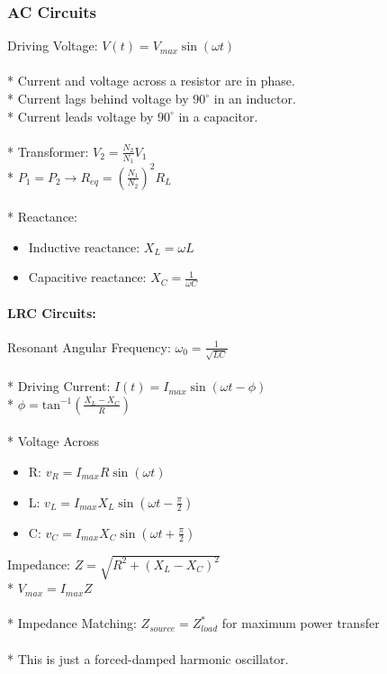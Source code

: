 \subsubsection{AC Circuits}
Driving Voltage: \(V(t)=V_{max}\sin(\omega t)\)\\\\*
Current and voltage across a resistor are in phase.\\*
Current lags behind voltage by \(90^{\circ}\) in an inductor.\\*
Current leads voltage by \(90^{\circ}\) in a capacitor.\\\\*
Transformer: \(\displaystyle V_2=\frac{N_2}{N_1}V_1\)\\*
\(\displaystyle P_1=P_2\to R_{eq}=\left(\frac{N_1}{N_2}\right)^2R_L\)\\\\*
Reactance:
\begin{itemize}
\item Inductive reactance: \(X_L=\omega L\)
\item Capacitive reactance: \(\displaystyle X_C=\frac{1}{\omega C}\)
\end{itemize}
\paragraph{LRC Circuits:}
Resonant Angular Frequency: \(\displaystyle\omega_{0}=\frac{1}{\sqrt{LC}}\)\\\\*
Driving Current: \(I(t)=I_{max}\sin(\omega t-\phi)\)\\*
\(\phi =\mathrm{tan}^{-1}\left(\frac{X_L-X_C}{R}\right)\)\\\\*
Voltage Across
\begin{itemize}
\item R: \(v_R=I_{max}R\sin(\omega t)\)
\item L: \(v_L=I_{max}X_L\sin\left(\omega t-\frac{\pi}{2}\right)\)
\item C: \(v_C=I_{max}X_C\sin\left(\omega t+\frac{\pi}{2}\right)\)
\end{itemize}
Impedance: \(Z=\sqrt{R^2+(X_L-X_C)^2}\)\\*
\(V_{max}=I_{max}Z\)\\\\*
Impedance Matching: \(Z_{source}=Z_{load}^*\) for maximum power transfer\\\\*
This is just a forced-damped harmonic oscillator.

